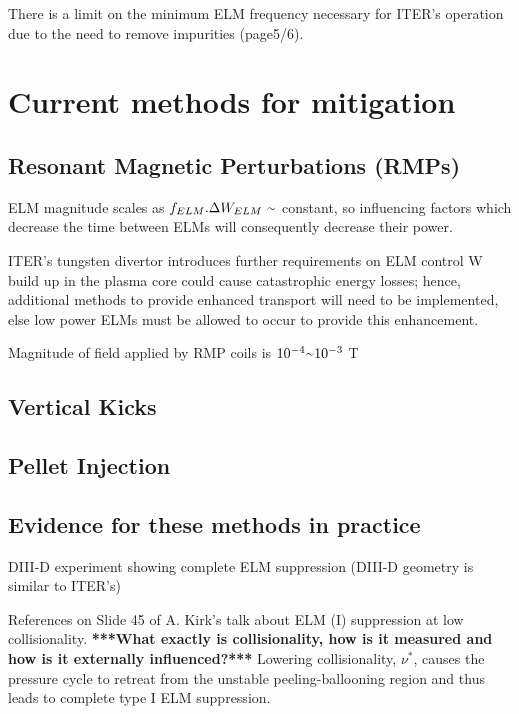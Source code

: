 \documentclass[12pt]{article}  %
\providecommand{\squiggle}{\raise.17ex\hbox{$\scriptstyle\sim$}} %
\begin{document}
There is a limit on the minimum ELM frequency necessary for ITER's operation due to the need to remove impurities (page5/6).\cite{Loarte2014a}

\section{Current methods for mitigation}\label{sec:Mitigation}

\subsection{Resonant Magnetic Perturbations (RMPs)}\label{ssec:RMP}

ELM magnitude scales as $f_{ELM}.\Delta W_{ELM}~\squiggle$ constant\cite{KirkFF}, so influencing factors which decrease the time between ELMs will consequently decrease their power.

ITER's tungsten divertor introduces further requirements on ELM control\cite{KirkFF} W build up in the plasma core could cause catastrophic energy losses; hence, additional methods to provide enhanced transport will need to be implemented, else low power ELMs must be allowed to occur to provide this enhancement.

Magnitude of field applied by RMP coils is $10^{-4} \squiggle 10^{-3}$ T\cite{Evans2015}

\subsection{Vertical Kicks}\label{ssec:Vkicks}

\subsection{Pellet Injection}\label{ssec:PInjection}


\subsection{Evidence for these methods in practice}\label{ssec:EIP}
DIII-D experiment showing complete ELM suppression (DIII-D geometry is similar to ITER's)\cite{Mordijck2011}

References on Slide 45 of A. Kirk's talk about ELM (I) suppression at low collisionality. \textbf{***What exactly is collisionality, how is it measured and how is it externally influenced?***} Lowering collisionality, $\nu^{*}$, causes the pressure cycle to retreat from the unstable peeling-ballooning region and thus leads to complete type I ELM suppression.\cite{Evans2008}
\end{document}
